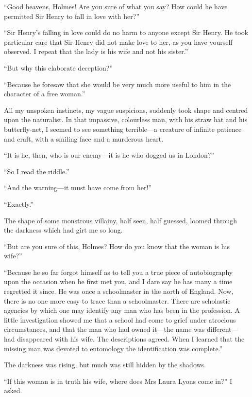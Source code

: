 \documentclass[paper=5.5in:8.5in,BCOR=7mm,twoside,DIV=calc,12pt,usegeometry,openany,chapterprefix,endperiod,headings=big]{scrbook} %
\begin{document}
\enquote{Good heavens, Holmes! Are you sure of what you say? How could he have permitted Sir Henry to fall in love with her?}

\enquote{Sir Henry's falling in love could do no harm to anyone except Sir Henry. He took particular care that Sir Henry did not make love to her, as you have yourself observed. I repeat that the lady is his wife and not his sister.}

\enquote{But why this elaborate deception?}

\enquote{Because he foresaw that she would be very much more useful to him in the character of a free woman.}

All my unspoken instincts, my vague suspicions, suddenly took shape and centred upon the naturalist. In that impassive, colourless man, with his straw hat and his butterfly-net, I seemed to see something terrible---a creature of infinite patience and craft, with a smiling face and a murderous heart.

\enquote{It is he, then, who is our enemy---it is he who dogged us in London?}

\enquote{So I read the riddle.}

\enquote{And the warning---it must have come from her!}

\enquote{Exactly.}

The shape of some monstrous villainy, half seen, half guessed, loomed through the darkness which had girt me so long.

\enquote{But are you sure of this, Holmes? How do you know that the woman is his wife?}

\enquote{Because he so far forgot himself as to tell you a true piece of autobiography upon the occasion when he first met you, and I dare say he has many a time regretted it since. He was once a schoolmaster in the north of England. Now, there is no one more easy to trace than a schoolmaster. There are scholastic agencies by which one may identify any man who has been in the profession. A little investigation showed me that a school had come to grief under atrocious circumstances, and that the man who had owned it---the name was different---had disappeared with his wife. The descriptions agreed. When I learned that the missing man was devoted to entomology the identification was complete.}

The darkness was rising, but much was still hidden by the shadows.

\enquote{If this woman is in truth his wife, where does Mrs Laura Lyons come in?} I asked.
\end{document}
